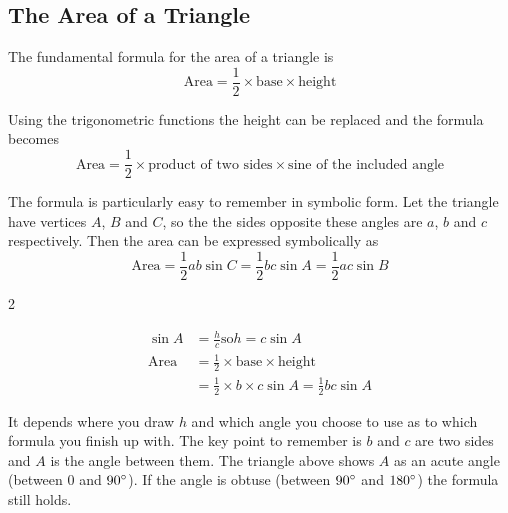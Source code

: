 \subsection{The Area of a Triangle}
The fundamental formula for the area of a triangle is
\begin{equation*}\text{Area} =\frac{1}{2} \times \text{base} \times \text{height}
\end{equation*}

Using the trigonometric functions the height can be replaced
and the formula becomes
\begin{equation*}\text{Area} =\frac{1}{2} \times \text{product of two sides} \times \text{sine of the included angle}
\end{equation*}

The formula is particularly easy to remember in symbolic form. Let
the triangle have vertices $A$, $B$ and $C$, so the the sides opposite these angles are $a$, $b$ and $c$ respectively. Then the area can be expressed symbolically as
\begin{equation*}\text{Area} =\frac{1}{2} a b \sin  C =\frac{1}{2} b c \sin  A =\frac{1}{2} a c \sin  B
\end{equation*}


\columnsep =30pt
\begin {multicols}{2}
 

   
\setlength\fboxrule{0in}\setlength\fboxsep{0.2in}



\begin{align*}\sin  A &  = \frac{h}{c}\text{so}h =c \sin  A \\
\text{Area} &  =  \frac{1}{2} \times \text{base} \times \text{height} \\
 &  =  \frac{1}{2} \times b \times c \sin  A =\frac{1}{2} b c \sin  A\end{align*}


\end {multicols}


It depends where you draw $h$ and which angle you choose to use as to which formula you finish up with. The key
point to remember is $b$ and $c$ are two sides and $A$ is the angle between them. The triangle above shows $A$ as an acute angle (between $0$ and $90 \mbox{{\ensuremath{{}^\circ}}}$). If the angle is obtuse (between $90 \mbox{{\ensuremath{{}^\circ}}}$ and $180 \mbox{{\ensuremath{{}^\circ}}}$) the formula still holds. 

